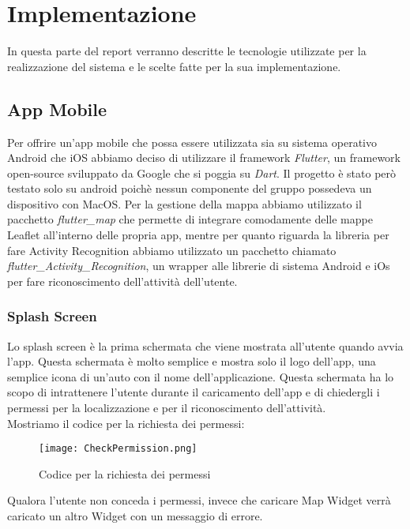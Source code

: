 \documentclass[../../Report.tex]{subfiles}
\begin{document}
\chapter{Implementazione}
\label{chap:Implementazione}
In questa parte del report verranno descritte le tecnologie utilizzate per la realizzazione del sistema e le scelte fatte per la sua implementazione.\\

\section{App Mobile}
    Per offrire un'app mobile che possa essere utilizzata sia su sistema operativo Android che iOS abbiamo deciso di utilizzare il framework \emph{Flutter}, un framework open-source sviluppato da Google che si poggia su \emph{Dart}. Il progetto è stato però testato solo su android poichè nessun componente del gruppo possedeva un dispositivo con MacOS. Per la gestione della mappa abbiamo utilizzato il pacchetto \emph{flutter\_map} che permette di integrare comodamente delle mappe Leaflet all'interno delle propria app, mentre per quanto riguarda la libreria per fare Activity Recognition abbiamo utilizzato un pacchetto chiamato \emph{flutter\_Activity\_Recognition}, un wrapper alle librerie di sistema Android e iOs per fare riconoscimento dell'attività dell'utente. \\

\subsection{Splash Screen}
Lo splash screen è la prima schermata che viene mostrata all'utente quando avvia l'app. Questa schermata è molto semplice e mostra solo il logo dell'app, una semplice icona di un'auto con il nome dell'applicazione. Questa schermata ha lo scopo di intrattenere l'utente durante il caricamento dell'app e di chiedergli i permessi per la localizzazione e per il riconoscimento dell'attività.\\
Mostriamo il codice per la richiesta dei permessi:
\begin{figure}[H]
  \centering
  \texttt{[image: CheckPermission.png]}
  \caption{Codice per la richiesta dei permessi}
\end{figure}
Qualora l'utente non conceda i permessi, invece che caricare Map Widget verrà caricato un altro Widget con un messaggio di errore. \\
\end{document}
